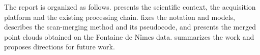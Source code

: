 
The report is organized as follows.  presents the scientific context, the
acquisition platform and the existing processing chain.  fixes the notation
and models,  describes the scan-merging method and its pseudocode, and
 presents the merged point clouds obtained on the Fontaine de N\^imes data.
 summarizes the work and proposes directions for future work.
